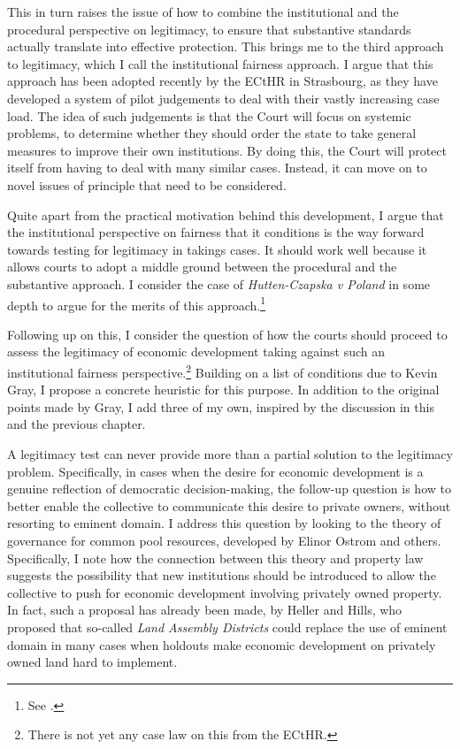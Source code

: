 This in turn raises the issue of how to combine the institutional and the procedural perspective on legitimacy, to ensure that substantive standards actually translate into effective protection. This brings me to the third approach to legitimacy, which I call the institutional fairness approach. I argue that this approach has been adopted recently by the ECtHR in Strasbourg, as they have developed a system of pilot judgements to deal with their vastly increasing case load. The idea of such judgements is that the Court will focus on systemic problems, to determine whether they should order the state to take general measures to improve their own institutions. By doing this, the Court will protect itself from having to deal with many similar cases. Instead, it can move on to novel issues of principle that need to be considered.

Quite apart from the practical motivation behind this development, I argue that the institutional perspective on fairness that it conditions is the way forward towards testing for legitimacy in takings cases. It should work well because it allows courts to adopt a middle ground between the procedural and the substantive approach. I consider the case of {\it Hutten-Czapska v Poland} in some depth to argue for the merits of this approach.\footnote{See \cite{hutten06}.}

Following up on this, I consider the question of how the courts should proceed to assess the legitimacy of economic development taking against such an institutional fairness perspective.\footnote{There is not yet any case law on this from the ECtHR.} Building on a list of conditions due to Kevin Gray, I propose a concrete heuristic for this purpose. In addition to the original points made by Gray, I add three of my own, inspired by the discussion in this and the previous chapter. 

A legitimacy test can never provide more than a partial solution to the legitimacy problem. Specifically, in cases when the desire for economic development is a genuine reflection of democratic decision-making, the follow-up question is how to better enable the collective to communicate this desire to private owners, without resorting to eminent domain. I address this question by looking to the theory of governance for common pool resources, developed by Elinor Ostrom and others. Specifically, I note how the connection between this theory and property law suggests the possibility that new institutions should be introduced to allow the collective to push for economic development involving privately owned property. In fact, such a proposal has already been made, by Heller and Hills, who proposed that so-called {\it Land Assembly Districts} could replace the use of eminent domain in many cases when holdouts make economic development on privately owned land hard to implement.  

